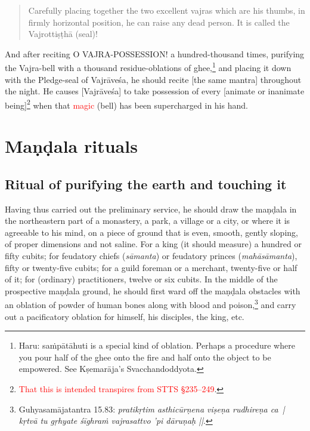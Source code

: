 \documentclass[11pt]{book}
\makeatletter
\def\fakesc#1{%
  \begingroup%
  \xdef\fake@name{\csname\curr@fontshape/\f@size\endcsname}%
  \fontsize{1.3\fontdimen8\fake@name}{\baselineskip}\selectfont%
  \uppercase{#1}%
  \endgroup%
}
\newcommand{\mantra}[1]{\fakesc{#1}}
\newcommand{\red}[1]{\textcolor{red}{#1}}
\newcommand{\skt}[1]{\emph{#1}}
\makeatother
\begin{document}
\begin{verse}
Carefully placing together the two excellent vajras which are his thumbs, in firmly horizontal position, he can raise any dead person. It is called the Vajrottiṣṭhā (seal)!
\end{verse}

And after reciting \mantra{o vajra-possession!} a hundred-thousand times, purifying the Vajra-bell with a thousand residue-oblations of ghee,\footnote{Haru: saṁpātāhuti is a special kind of oblation. Perhaps a procedure where you pour half of the ghee onto the fire and half onto the object to be empowered. See Kṣemarāja's Svacchandoddyota.} and placing it down with the Pledge-seal of Vajrāveśa, he should recite [the same mantra] throughout the night. He causes [Vajrāveśa] to take possession of every [animate or inanimate being]\footnote{\red{That this is intended transpires from STTS §235--249}.} when that \red{magic} (bell) has been supercharged in his hand.


\chapter{Maṇḍala rituals}

\section{Ritual of purifying the earth and touching it}
Having thus carried out the preliminary service, he should draw the maṇḍala in the northeastern part of a monastery, a park, a village or a city, or where it is agreeable to his mind, on a piece of ground that is even, smooth, gently sloping, of proper dimensions and not saline. For a king (it should measure) a hundred or fifty cubits; for feudatory chiefs (\skt{sāmanta}) or feudatory princes (\skt{mahāsāmanta}), fifty or twenty-five cubits; for a guild foreman or a merchant, twenty-five or half of it; for (ordinary) practitioners,%
twelve or six cubits. In the middle of the prospective maṇḍala ground, he should first ward off the maṇḍala obstacles with an oblation of powder of human bones along with blood and poison,\footnote{Guhyasamājatantra 15.83: \skt{pratikṛtim asthicūrṇena viṣeṇa rudhireṇa ca~| kṛtvā tu gṛhyate śīghraṁ vajrasattvo 'pi dāruṇaḥ ||}.} and carry out a pacificatory oblation for himself, his disciples, the king, etc.
\end{document}
